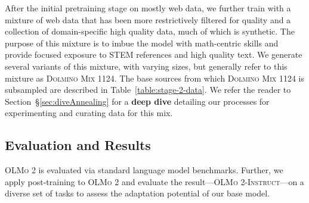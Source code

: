 \documentclass[table]{ai2style/ai2}
\newcommand{\olmotoo}{\textsc{OLMo 2}\xspace}
\newcommand{\olmotooinstruct}{\textsc{OLMo 2-Instruct}\xspace}
\newcommand{\dolminos}{\textsc{Dolmino Mix 1124}\xspace}
\begin{document}
After the initial pretraining stage on mostly web data, we further train with a mixture of web data that has been more restrictively filtered for quality and a collection of domain-specific high quality data, much of which is synthetic. 
The purpose of this mixture is to imbue the model with math-centric skills and provide focused exposure to STEM references and high quality text. 
We generate several variants of this mixture, with varying sizes, but generally refer to this mixture as \dolminos. 
The base sources from which \dolminos is subsampled are described in Table~\ref{table:stage-2-data}. 
We refer the reader to Section~\S\ref{sec:diveAnnealing} for a {\bf deep dive} detailing our processes for experimenting and curating data for this mix.

\subsection{Evaluation and Results}
\label{sec:basemodeleval}

\olmotoo is evaluated via standard language model benchmarks. 
Further, we apply post-training to \olmotoo and evaluate the result---\olmotooinstruct---on a diverse set of tasks to assess the adaptation potential of our base model.
\end{document}
